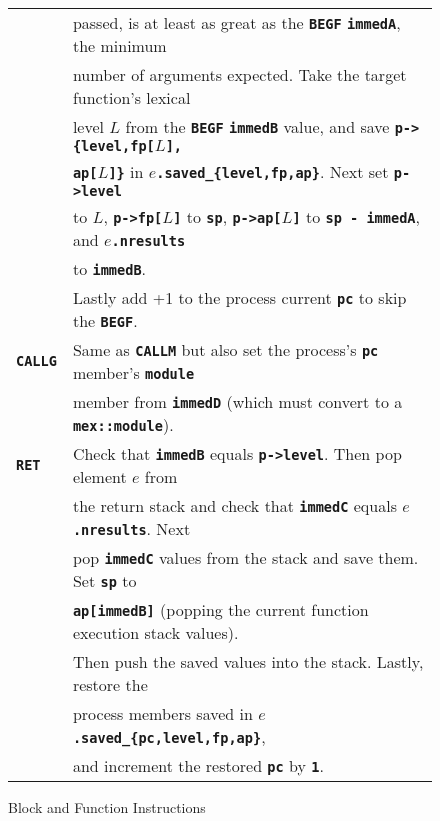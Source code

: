 \documentclass[12pt]{article}
\makeatletter
\newcommand{\TT}[1]{{\tt \bfseries #1}}
\newcommand{\ttkey}[1]{\TT{#1}\index{#1@{\tt #1}}}
\newlength{\figurewidth}
\newenvironment{boxedfigure}[1][!btp]%
	{\begin{figure*}[#1]
	 \begin{lrbox}{\figurebox}
	 \begin{minipage}{\figurewidth}

	 \vspace*{1ex}}%
	{
	 \vspace*{1ex}

	 \end{minipage}
	 \end{lrbox}

	 \centering
	 \fbox{\hspace*{0.1in}\usebox{\figurebox}\hspace*{0.1in}}
	 \end{figure*}}
\makeatother
\begin{document}
\begin{boxedfigure}
\begin{center}
\begin{tabular}{|l|l|}
    & passed, is at least as great as the \TT{BEGF}
      \TT{immedA}, the minimum \\
    & number of arguments expected.  Take the target 
      function's lexical \\
    & level $L$ from the \TT{BEGF} \TT{immedB} value, and save
      \TT{p->\{level,fp[$L$],} \\
    & \TT{ap[$L$]\}} in \TT{$e$.saved\_\{level,fp,ap\}}.
       Next set \TT{p->level} \\
    & to $L$, \TT{p->fp[$L$]} to \TT{sp}, \TT{p->ap[$L$]} to \TT{sp - immedA},
      and \TT{$e$.nresults} \\
    & to \TT{immedB}.
    \\[0.5ex]
    & Lastly add +1 to the process current \TT{pc} to skip the \TT{BEGF}.
\\\hline
\ttkey{CALLG}
    & Same as \TT{CALLM} but also set the process's \TT{pc} member's 
                                                           \TT{module} \\
    & member from \TT{immedD} (which must convert to a \TT{mex::module}).
\\\hline
\ttkey{RET}
    & Check that \TT{immedB} equals \TT{p->level}.  Then pop element $e$
      from \\
    & the return stack and check that \TT{immedC} equals
       \TT{$e$.nresults}.  Next \\
    & pop \TT{immedC} values from the stack and save them.  Set \TT{sp} to \\
    & \TT{ap[immedB]} (popping the
      current function execution stack values).  \\
    & Then push the saved values into the stack. Lastly, restore the \\
    & process members saved in \TT{$e$.saved\_\{pc,level,fp,ap\}}, \\
    & and increment the restored \TT{pc} by \TT{1}.
\\\hline
\end{tabular}
\end{center}
\caption{Block and Function Instructions}
\label{BLOCK-AND-FUNCTION-INSTRUCTIONS}
\end{boxedfigure}

\clearpage
\end{document}
